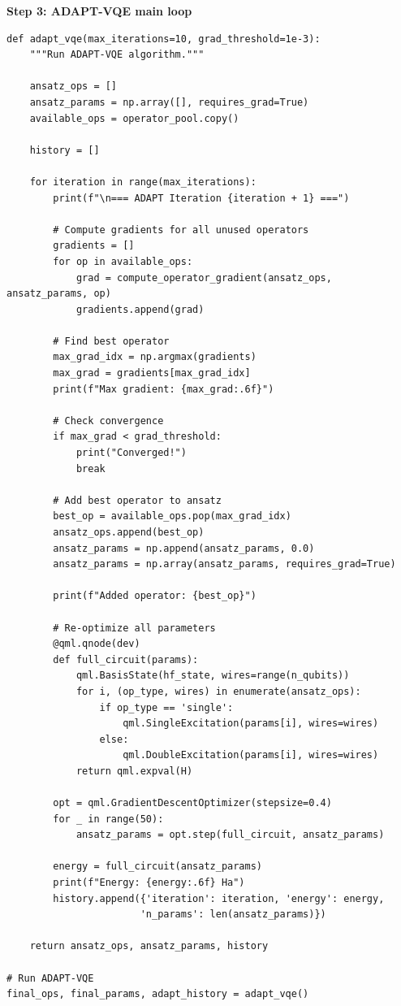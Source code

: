 \documentclass[11pt,a4paper]{article}
\begin{document}
\textbf{Step 3: ADAPT-VQE main loop}
\begin{lstlisting}
def adapt_vqe(max_iterations=10, grad_threshold=1e-3):
    """Run ADAPT-VQE algorithm."""
    
    ansatz_ops = []
    ansatz_params = np.array([], requires_grad=True)
    available_ops = operator_pool.copy()
    
    history = []
    
    for iteration in range(max_iterations):
        print(f"\n=== ADAPT Iteration {iteration + 1} ===")
        
        # Compute gradients for all unused operators
        gradients = []
        for op in available_ops:
            grad = compute_operator_gradient(ansatz_ops, ansatz_params, op)
            gradients.append(grad)
        
        # Find best operator
        max_grad_idx = np.argmax(gradients)
        max_grad = gradients[max_grad_idx]
        print(f"Max gradient: {max_grad:.6f}")
        
        # Check convergence
        if max_grad < grad_threshold:
            print("Converged!")
            break
        
        # Add best operator to ansatz
        best_op = available_ops.pop(max_grad_idx)
        ansatz_ops.append(best_op)
        ansatz_params = np.append(ansatz_params, 0.0)
        ansatz_params = np.array(ansatz_params, requires_grad=True)
        
        print(f"Added operator: {best_op}")
        
        # Re-optimize all parameters
        @qml.qnode(dev)
        def full_circuit(params):
            qml.BasisState(hf_state, wires=range(n_qubits))
            for i, (op_type, wires) in enumerate(ansatz_ops):
                if op_type == 'single':
                    qml.SingleExcitation(params[i], wires=wires)
                else:
                    qml.DoubleExcitation(params[i], wires=wires)
            return qml.expval(H)
        
        opt = qml.GradientDescentOptimizer(stepsize=0.4)
        for _ in range(50):
            ansatz_params = opt.step(full_circuit, ansatz_params)
        
        energy = full_circuit(ansatz_params)
        print(f"Energy: {energy:.6f} Ha")
        history.append({'iteration': iteration, 'energy': energy, 
                       'n_params': len(ansatz_params)})
    
    return ansatz_ops, ansatz_params, history

# Run ADAPT-VQE
final_ops, final_params, adapt_history = adapt_vqe()
\end{lstlisting}
\end{document}
